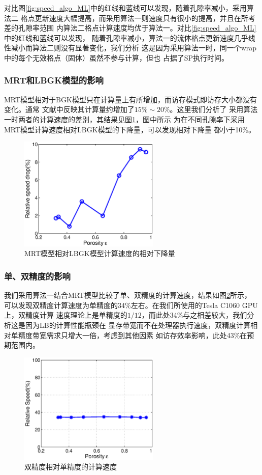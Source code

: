 对比图\ref{fig:speed_algo_ML}中的红线和蓝线可以发现，随着孔隙率减小，采用算法二
格点更新速度大幅提高，而采用算法一则速度只有很小的提高，并且在所考差的孔隙率范围
内算法二格点计算速度均优于算法一。对比\ref{fig:speed_algo_ML}中的红线和蓝线可以发现，
随着孔隙率减小，算法一的流体格点更新速度几乎线性减小而算法二则没有显著变化，我们分析
这是因为采用算法一时，同一个wrap中的每个无效格点（固体）虽然不参与计算，但也
占据了SP执行时间。

\subsubsection{MRT和LBGK模型的影响}
MRT模型相对于BGK模型只在计算量上有所增加，而访存模式即访存大小都没有变化。通常
文献中反映其计算量约增加了$15\%\sim20\%$。这里我们分析了
采用算法一时两者的计算速度的差别，其结果见图\ref{fig:speed_model}，图中所示
为在不同孔隙率下采用MRT模型计算速度相对LBGK模型的下降量，可以发现相对下降量
都小于10\%。
\begin{figure}[htb]
  \centering
  \includegraphics[width=0.6\textwidth]{img/speed_model}
  \caption{MRT模型相对LBGK模型计算速度的相对下降量}
  \label{fig:speed_model}
\end{figure}

\subsubsection{单、双精度的影响}
我们采用算法一结合MRT模型比较了单、双精度的计算速度，结果如图\ref{fig:speed_dpsp}所示，
可以发现双精度计算速度为单精度的34\%左右。在我们所使用的Tesla C1060 GPU上，双精度计算
速度理论上是单精度的$1/12$，而此处34\%与之相差较大，我们分析这是因为LB的计算性能瓶颈在
显存带宽而不在处理器执行速度，双精度计算相对单精度带宽需求只增大一倍，考虑到其他因素
如访存效率影响，此处43\%在预期范围内。
\begin{figure}[htb]
  \centering
  \includegraphics[width=0.6\textwidth]{img/speed_dpsp}
  \caption{双精度相对单精度的计算速度}
  \label{fig:speed_dpsp}
\end{figure}

